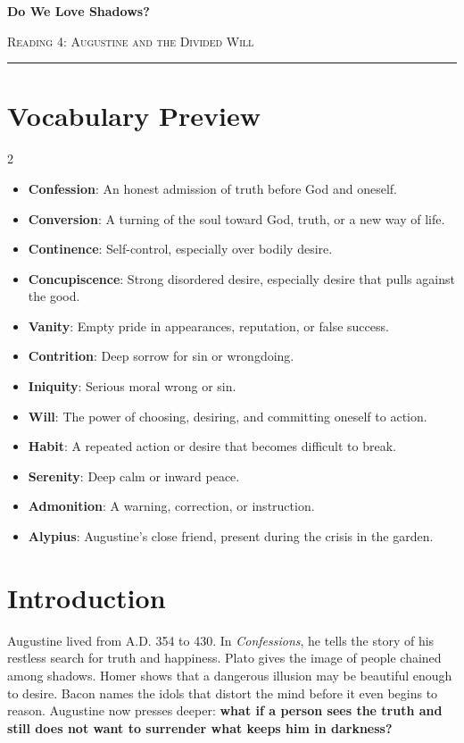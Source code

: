 \documentclass[12pt]{article}
\begin{document}
\begin{center}
{\LARGE\bfseries Do We Love Shadows?}\par\vspace{0.25em}
{\large\scshape Reading 4: Augustine and the Divided Will}\par\vspace{0.45em}
\rule{0.82\textwidth}{0.4pt}\par\vspace{0.7em}
\end{center}

\section*{Vocabulary Preview}
\begin{multicols}{2}
\begin{itemize}[leftmargin=*, itemsep=0.18em]
\item \textbf{Confession}: An honest admission of truth before God and oneself.
\item \textbf{Conversion}: A turning of the soul toward God, truth, or a new way of life.
\item \textbf{Continence}: Self-control, especially over bodily desire.
\item \textbf{Concupiscence}: Strong disordered desire, especially desire that pulls against the good.
\item \textbf{Vanity}: Empty pride in appearances, reputation, or false success.
\item \textbf{Contrition}: Deep sorrow for sin or wrongdoing.
\item \textbf{Iniquity}: Serious moral wrong or sin.
\item \textbf{Will}: The power of choosing, desiring, and committing oneself to action.
\item \textbf{Habit}: A repeated action or desire that becomes difficult to break.
\item \textbf{Serenity}: Deep calm or inward peace.
\item \textbf{Admonition}: A warning, correction, or instruction.
\item \textbf{Alypius}: Augustine's close friend, present during the crisis in the garden.
\end{itemize}
\end{multicols}

\section*{Introduction}
Augustine lived from A.D. 354 to 430. In \textit{Confessions}, he tells the story of his restless search for truth and happiness. Plato gives the image of people chained among shadows. Homer shows that a dangerous illusion may be beautiful enough to desire. Bacon names the idols that distort the mind before it even begins to reason. Augustine now presses deeper: \textbf{what if a person sees the truth and still does not want to surrender what keeps him in darkness?}
\end{document}
